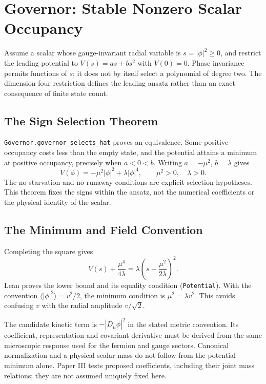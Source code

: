 \section{Governor: Stable Nonzero Scalar Occupancy}
\label{sec:governor}

Assume a scalar whose gauge-invariant radial variable is $s=|\phi|^2\geq0$, and restrict the leading potential to $V(s)=as+bs^2$ with $V(0)=0$. Phase invariance permits functions of $s$; it does not by itself select a polynomial of degree two. The dimension-four restriction defines the leading ansatz rather than an exact consequence of finite state count.

\subsection{The Sign Selection Theorem}
\nolinkurl{Governor.governor_selects_hat} proves an equivalence. Some positive occupancy costs less than the empty state, and the potential attains a minimum at positive occupancy, precisely when $a<0<b$. Writing $a=-\mu^2$, $b=\lambda$ gives
\begin{equation}
 V(\phi)=-\mu^2|\phi|^2+\lambda|\phi|^4,
 \qquad\mu^2>0,\quad\lambda>0.
 \label{eq:higgs_potential}
\end{equation}
The no-starvation and no-runaway conditions are explicit selection hypotheses. This theorem fixes the signs within the ansatz, not the numerical coefficients or the physical identity of the scalar.

\subsection{The Minimum and Field Convention}
Completing the square gives
\begin{equation}
 V(s)+\frac{\mu^4}{4\lambda}
 =\lambda\left(s-\frac{\mu^2}{2\lambda}\right)^2.
\end{equation}
Lean proves the lower bound and its equality condition (\nolinkurl{Potential}). With the convention $\langle|\phi|^2\rangle=v^2/2$, the minimum condition is $\mu^2=\lambda v^2$. This avoids confusing $v$ with the radial amplitude $v/\sqrt2$.

The candidate kinetic term is $-|D_\mu\phi|^2$ in the stated metric convention. Its coefficient, representation and covariant derivative must be derived from the same microscopic response used for the fermion and gauge sectors. Canonical normalization and a physical scalar mass do not follow from the potential minimum alone. Paper III tests proposed coefficients, including their joint mass relations; they are not assumed uniquely fixed here.


